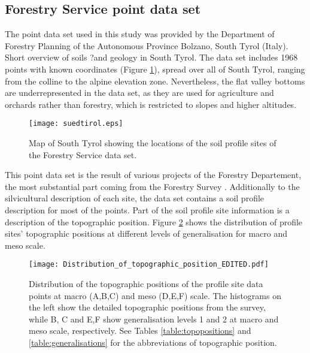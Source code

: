 \documentclass[final,1p,times,twocolumn,authoryear]{elsarticle}
\begin{document}
\subsection{Forestry Service point data set}
The point data set used in this study was provided by the Department of Forestry Planning of the Autonomous Province Bolzano, South Tyrol (Italy).
Short overview of soils ?and geology in South Tyrol.
The data set includes 1968 points with known coordinates (Figure \ref{fig:datapoints}), spread over all of South Tyrol, ranging from the colline to the alpine elevation zone. Nevertheless, the flat valley bottoms are underrepresented in the data set, as they are used for agriculture and orchards rather than forestry, which is restricted to slopes and higher altitudes.
\begin{figure}
\texttt{[image: suedtirol.eps]}
\caption{Map of South Tyrol showing the locations of the soil profile sites of the Forestry Service data set. }
\label{fig:datapoints}
\end{figure}
 This point data set is the result of  various projects of the Forestry Departement, the most substantial part coming from the Forestry Survey \citep{APB2006}. Additionally to the silvicultural description of each site, the data set contains a soil profile description for most of the points. Part of the soil profile site information is a description of the topographic position. Figure \ref{fig:hist} shows the distribution of profile sites' topographic positions at different levels of generalisation for macro and meso scale.



\begin{figure}
\texttt{[image: Distribution\_of\_topographic\_position\_EDITED.pdf]}
\caption{Distribution of the topographic positions of the profile site data points at macro (A,B,C) and meso (D,E,F) scale. The histograms on the left show the detailed topographic positions from the survey, while B, C and E,F show generalisation levels 1 and 2 at macro and meso scale, respectively. See Tables \ref{table:topopositions} and \ref{table:generalisations} for the abbreviations of topographic position. }
\label{fig:hist}
\end{figure}
\end{document}
